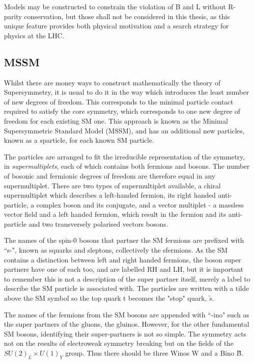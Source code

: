 Models may be constructed to constrain the violation of B and L without R-parity conservation, but those shall not be considered in this thesis, as this unique feature provides both physical motivation and a search strategy for physics at the LHC.


\subsection{MSSM} 

Whilst there are money ways to construct mathematically the theory of Supersymmetry, it is usual to do it in the way which introduces the least number of new degrees of freedom. This corresponds to the minimal particle contact required to satisfy the core symmetry, which corresponds to one new degree of freedom for each existing SM one. This approach is known as the Minimal Supersymmetric Standard Model (MSSM), and has an additional new particles, known as a sparticle, for each known SM particle. 

The particles are arranged to fit the irreducible representation of the symmetry, in \textit{supermultiplets}, each of which contains both fermions and bosons. The number of bosonic and fermionic degrees of freedom are therefore equal in any supermultiplet. There are two types of supermultiplet available, a chiral supermultiplet which describes a left-handed fermion, its right handed anti-particle, a complex boson and its conjugate, and a vector multiplet - a massless vector field and a left handed fermion, which result in the fermion and its anti-particle and two transversely polarised vectors bosons\cite{SUSYPrime}. 

The names of the spin-0 bosons that partner the SM fermions are prefixed with ``s-", known as squarks and sleptons, collectively the sfermions. As the SM contains a distinction between left and right handed fermions, the boson super partners have one of each too, and are labelled RH and LH, but it is important to remember this is not a description of the super partner itself, merely a label to describe the SM particle is associated with. The particles are written with a tilde above the SM symbol so the top quark t becomes the "stop" quark, $\tilde{s}$.

The names of the fermions from the SM bosons are appended with ``-ino" such as the super partners of the gluons, the gluinos. However, for the other fundamental SM bosons, identifying their super-partners is not so simple. The symmetry acts not on the results of electroweak symmetry breaking but on the fields of the $SU(2)_{L} \times U(1)_{Y}$ group. Thus there should be three Winos {W} and a Bino \~{B}. 


